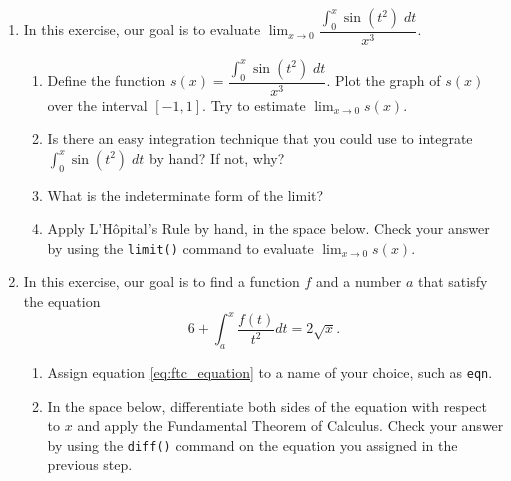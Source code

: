 \begin{enumerate}        
    \item In this exercise, our goal is to evaluate $\displaystyle\lim_{x \rightarrow 0} \dfrac{\int_{0}^x \sin(t^2) \; dt}{x^3}.$
    \begin{enumerate}
        \item Define the function $s(x) = \dfrac{\int_{0}^x \sin(t^2) \; dt}{x^3}$.  Plot the graph of $s(x)$ over the interval $[-1,1]$. Try to estimate $\displaystyle\lim_{x\rightarrow0}s(x)$.
        \item Is there an easy integration technique that you could use to integrate $\displaystyle\int_{0}^x \sin(t^2) \; dt$ by hand?  If not, why?
        \item What is the indeterminate form of the limit?
        \item Apply L'H\^opital's Rule by hand, in the space below. Check your answer by using the \texttt{limit()} command to evaluate $\displaystyle\lim_{x\rightarrow0}s(x)$.
    \end{enumerate}
    \begin{fullwidth}
    \end{fullwidth}
\clearpage
    \item In this exercise, our goal is to find a function $f$ and a number $a$ that satisfy the equation 
    \begin{equation}
        \label{eq:ftc_equation}
        6 + \displaystyle\int_{a}^x \dfrac{f(t)}{t^2} dt = 2\sqrt{x}.
    \end{equation}
    \begin{enumerate}
        \item Assign equation \eqref{eq:ftc_equation} to a name of your choice, such as \texttt{eqn}.
        \item In the space below, differentiate both sides of the equation with respect to $x$ and apply the Fundamental Theorem of Calculus. Check your answer by using the \texttt{diff()} command on the equation you assigned in the previous step.

\end{enumerate}
\end{enumerate}
